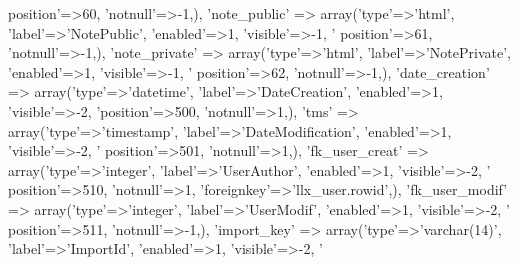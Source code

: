 \begin{DoxyCode}
{      position'}=>60, \textcolor{stringliteral}{'notnull'}=>-1,),
        \textcolor{stringliteral}{'note\_public'} => array(\textcolor{stringliteral}{'type'}=>\textcolor{stringliteral}{'html'}, \textcolor{stringliteral}{'label'}=>\textcolor{stringliteral}{'NotePublic'}, \textcolor{stringliteral}{'enabled'}=>1, \textcolor{stringliteral}{'visible'}=>-1, \textcolor{stringliteral}{'
      position'}=>61, \textcolor{stringliteral}{'notnull'}=>-1,),
        \textcolor{stringliteral}{'note\_private'} => array(\textcolor{stringliteral}{'type'}=>\textcolor{stringliteral}{'html'}, \textcolor{stringliteral}{'label'}=>\textcolor{stringliteral}{'NotePrivate'}, \textcolor{stringliteral}{'enabled'}=>1, \textcolor{stringliteral}{'visible'}=>-1, \textcolor{stringliteral}{'
      position'}=>62, \textcolor{stringliteral}{'notnull'}=>-1,),
        \textcolor{stringliteral}{'date\_creation'} => array(\textcolor{stringliteral}{'type'}=>\textcolor{stringliteral}{'datetime'}, \textcolor{stringliteral}{'label'}=>\textcolor{stringliteral}{'DateCreation'}, \textcolor{stringliteral}{'enabled'}=>1, \textcolor{stringliteral}{'visible'}=>-2, \textcolor{stringliteral}{
      'position'}=>500, \textcolor{stringliteral}{'notnull'}=>1,),
        \textcolor{stringliteral}{'tms'} => array(\textcolor{stringliteral}{'type'}=>\textcolor{stringliteral}{'timestamp'}, \textcolor{stringliteral}{'label'}=>\textcolor{stringliteral}{'DateModification'}, \textcolor{stringliteral}{'enabled'}=>1, \textcolor{stringliteral}{'visible'}=>-2, \textcolor{stringliteral}{'
      position'}=>501, \textcolor{stringliteral}{'notnull'}=>1,),
        \textcolor{stringliteral}{'fk\_user\_creat'} => array(\textcolor{stringliteral}{'type'}=>\textcolor{stringliteral}{'integer'}, \textcolor{stringliteral}{'label'}=>\textcolor{stringliteral}{'UserAuthor'}, \textcolor{stringliteral}{'enabled'}=>1, \textcolor{stringliteral}{'visible'}=>-2, \textcolor{stringliteral}{'
      position'}=>510, \textcolor{stringliteral}{'notnull'}=>1, \textcolor{stringliteral}{'foreignkey'}=>\textcolor{stringliteral}{'llx\_user.rowid'},),
        \textcolor{stringliteral}{'fk\_user\_modif'} => array(\textcolor{stringliteral}{'type'}=>\textcolor{stringliteral}{'integer'}, \textcolor{stringliteral}{'label'}=>\textcolor{stringliteral}{'UserModif'}, \textcolor{stringliteral}{'enabled'}=>1, \textcolor{stringliteral}{'visible'}=>-2, \textcolor{stringliteral}{'
      position'}=>511, \textcolor{stringliteral}{'notnull'}=>-1,),
        \textcolor{stringliteral}{'import\_key'} => array(\textcolor{stringliteral}{'type'}=>\textcolor{stringliteral}{'varchar(14)'}, \textcolor{stringliteral}{'label'}=>\textcolor{stringliteral}{'ImportId'}, \textcolor{stringliteral}{'enabled'}=>1, \textcolor{stringliteral}{'visible'}=>-2, \textcolor{stringliteral}{'
}
\end{DoxyCode}
